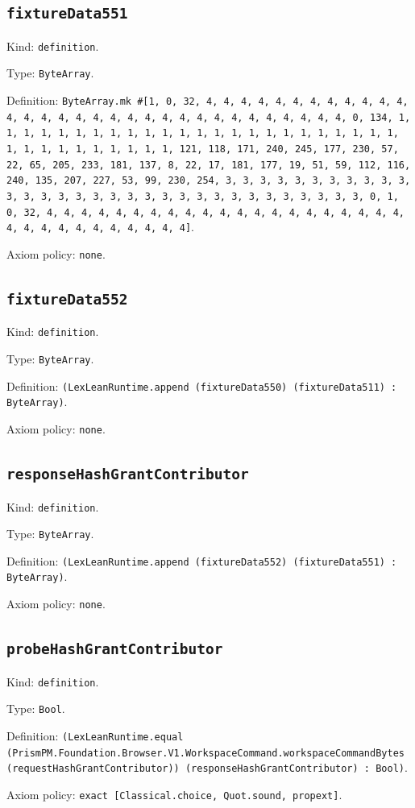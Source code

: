 \documentclass[11pt]{article}
\begin{document}
\subsection*{\texttt{fixtureData551}}
\noindent Kind: \texttt{definition}.\par
\noindent Type: \texttt{ByteArray}.\par
\noindent Definition: \texttt{ByteArray.mk \#[1, 0, 32, 4, 4, 4, 4, 4, 4, 4, 4, 4, 4, 4, 4, 4, 4, 4, 4, 4, 4, 4, 4, 4, 4, 4, 4, 4, 4, 4, 4, 4, 4, 4, 4, 0, 134, 1, 1, 1, 1, 1, 1, 1, 1, 1, 1, 1, 1, 1, 1, 1, 1, 1, 1, 1, 1, 1, 1, 1, 1, 1, 1, 1, 1, 1, 1, 1, 1, 1, 1, 121, 118, 171, 240, 245, 177, 230, 57, 22, 65, 205, 233, 181, 137, 8, 22, 17, 181, 177, 19, 51, 59, 112, 116, 240, 135, 207, 227, 53, 99, 230, 254, 3, 3, 3, 3, 3, 3, 3, 3, 3, 3, 3, 3, 3, 3, 3, 3, 3, 3, 3, 3, 3, 3, 3, 3, 3, 3, 3, 3, 3, 3, 3, 3, 0, 1, 0, 32, 4, 4, 4, 4, 4, 4, 4, 4, 4, 4, 4, 4, 4, 4, 4, 4, 4, 4, 4, 4, 4, 4, 4, 4, 4, 4, 4, 4, 4, 4, 4, 4]}.\par
\noindent Axiom policy: \texttt{none}.\par
\subsection*{\texttt{fixtureData552}}
\noindent Kind: \texttt{definition}.\par
\noindent Type: \texttt{ByteArray}.\par
\noindent Definition: \texttt{(LexLeanRuntime.append (fixtureData550) (fixtureData511) : ByteArray)}.\par
\noindent Axiom policy: \texttt{none}.\par
\subsection*{\texttt{responseHashGrantContributor}}
\noindent Kind: \texttt{definition}.\par
\noindent Type: \texttt{ByteArray}.\par
\noindent Definition: \texttt{(LexLeanRuntime.append (fixtureData552) (fixtureData551) : ByteArray)}.\par
\noindent Axiom policy: \texttt{none}.\par
\subsection*{\texttt{probeHashGrantContributor}}
\noindent Kind: \texttt{definition}.\par
\noindent Type: \texttt{Bool}.\par
\noindent Definition: \texttt{(LexLeanRuntime.equal (PrismPM.Foundation.Browser.V1.WorkspaceCommand.workspaceCommandBytes (requestHashGrantContributor)) (responseHashGrantContributor) : Bool)}.\par
\noindent Axiom policy: \texttt{exact [Classical.choice, Quot.sound, propext]}.\par
\end{document}
